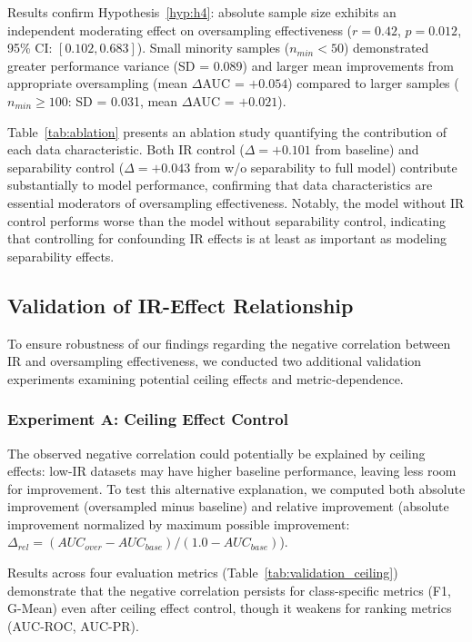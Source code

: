 \documentclass[12pt,a4paper]{article}
\theoremstyle{definition}
\begin{document}
Results confirm Hypothesis~\ref{hyp:h4}: absolute sample size exhibits an independent moderating effect on oversampling effectiveness ($r = 0.42$, $p = 0.012$, 95\% CI: $[0.102, 0.683]$). Small minority samples ($n_{min} < 50$) demonstrated greater performance variance (SD = 0.089) and larger mean improvements from appropriate oversampling (mean $\Delta$AUC = $+0.054$) compared to larger samples ($n_{min} \geq 100$: SD = 0.031, mean $\Delta$AUC = $+0.021$).

Table~\ref{tab:ablation} presents an ablation study quantifying the contribution of each data characteristic. Both IR control ($\Delta = +0.101$ from baseline) and separability control ($\Delta = +0.043$ from w/o separability to full model) contribute substantially to model performance, confirming that data characteristics are essential moderators of oversampling effectiveness. Notably, the model without IR control performs worse than the model without separability control, indicating that controlling for confounding IR effects is at least as important as modeling separability effects.

\subsection{Validation of IR-Effect Relationship}
To ensure robustness of our findings regarding the negative correlation between IR and oversampling effectiveness, we conducted two additional validation experiments examining potential ceiling effects and metric-dependence.

\subsubsection{Experiment A: Ceiling Effect Control}
The observed negative correlation could potentially be explained by ceiling effects: low-IR datasets may have higher baseline performance, leaving less room for improvement. To test this alternative explanation, we computed both absolute improvement (oversampled minus baseline) and relative improvement (absolute improvement normalized by maximum possible improvement: $\Delta_{rel} = (AUC_{over} - AUC_{base}) / (1.0 - AUC_{base})$).

Results across four evaluation metrics (Table~\ref{tab:validation_ceiling}) demonstrate that the negative correlation persists for class-specific metrics (F1, G-Mean) even after ceiling effect control, though it weakens for ranking metrics (AUC-ROC, AUC-PR).
\end{document}
